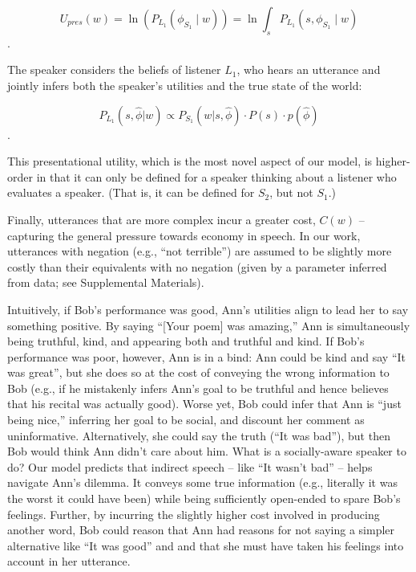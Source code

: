\documentclass[12pt]{article}
\begin{document}
\[U_{pres}(w) = \ln(P_{L_1}(\phi_{S_1} \mid w)) = \ln \int_s P_{L_1}(s, \phi_{S_1} \mid w)\].

The speaker considers the beliefs of listener \(L_1\), who hears an
utterance and jointly infers both the speaker's utilities and the true
state of the world:

\[P_{L_1}(s, \hat{\phi} | w) \propto P_{S_1}(w | s, \hat{\phi}) \cdot P(s) \cdot p(\hat{\phi})\].

This presentational utility, which is the most novel aspect of our
model, is higher-order in that it can only be defined for a speaker
thinking about a listener who evaluates a speaker. (That is, it can be
defined for \(S_2\), but not \(S_1\).)

Finally, utterances that are more complex incur a greater cost, \(C(w)\)
-- capturing the general pressure towards economy in speech. In our
work, utterances with negation (e.g., \enquote{not terrible}) are
assumed to be slightly more costly than their equivalents with no
negation (given by a parameter inferred from data; see Supplemental
Materials).

Intuitively, if Bob's performance was good, Ann's utilities align to
lead her to say something positive. By saying \enquote{{[}Your poem{]}
was amazing,} Ann is simultaneously being truthful, kind, and appearing
both and truthful and kind. If Bob's performance was poor, however, Ann
is in a bind: Ann could be kind and say \enquote{It was great}, but she
does so at the cost of conveying the wrong information to Bob (e.g., if
he mistakenly infers Ann's goal to be truthful and hence believes that
his recital was actually good). Worse yet, Bob could infer that Ann is
\enquote{just being nice,} inferring her goal to be social, and discount
her comment as uninformative. Alternatively, she could say the truth
(\enquote{It was bad}), but then Bob would think Ann didn't care about
him. What is a socially-aware speaker to do? Our model predicts that
indirect speech -- like \enquote{It wasn't bad} -- helps navigate Ann's
dilemma. It conveys some true information (e.g., literally it was the
worst it could have been) while being sufficiently open-ended to spare
Bob's feelings. Further, by incurring the slightly higher cost involved
in producing another word, Bob could reason that Ann had reasons for not
saying a simpler alternative like \enquote{It was good} and and that she
must have taken his feelings into account in her utterance.

\end{document}
